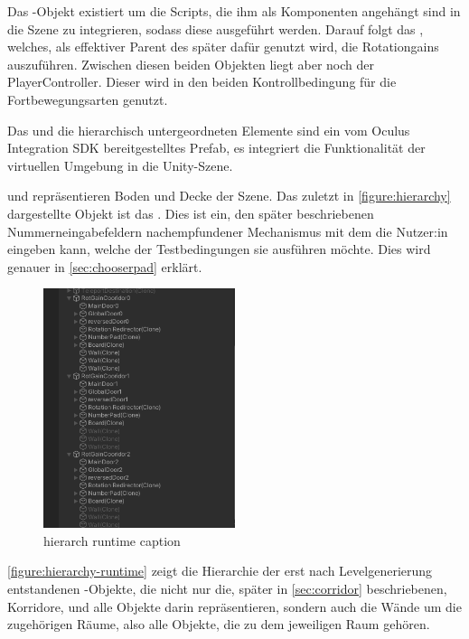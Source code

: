 Das -Objekt existiert um die Scripts, die ihm als Komponenten %
angehängt sind in die Szene zu integrieren, sodass diese ausgeführt werden. Darauf folgt das , welches, als effektiver Parent des  später dafür genutzt wird, die Rotationgains auszuführen. Zwischen diesen beiden Objekten liegt aber noch der PlayerController. Dieser wird in den beiden Kontrollbedingung für die Fortbewegungsarten genutzt.

Das  und die hierarchisch untergeordneten Elemente sind ein vom Oculus Integration SDK bereitgestelltes Prefab, es integriert die Funktionalität der virtuellen Umgebung in die Unity-Szene.

 und  repräsentieren Boden und Decke der Szene. Das zuletzt in \autoref{figure:hierarchy} dargestellte Objekt ist das . Dies ist ein, den später beschriebenen Nummerneingabefeldern nachempfundener Mechanismus mit dem die Nutzer:in eingeben kann, welche der Testbedingungen sie ausführen möchte. Dies wird genauer in \autoref{sec:chooserpad} erklärt.

\begin{figure}[!h]
    \centering
    \includegraphics[width=0.5\textwidth]{images/hierarchy_runtime.png}
    \caption{hierarch runtime caption}\label{figure:hierarchy-runtime}
\end{figure}

\autoref{figure:hierarchy-runtime} zeigt die Hierarchie der erst nach Levelgenerierung entstandenen -Objekte, die nicht nur die, später in \autoref{sec:corridor} beschriebenen, Korridore, und alle Objekte darin repräsentieren, sondern auch die Wände um die zugehörigen Räume, also alle Objekte, die zu dem jeweiligen Raum gehören.

